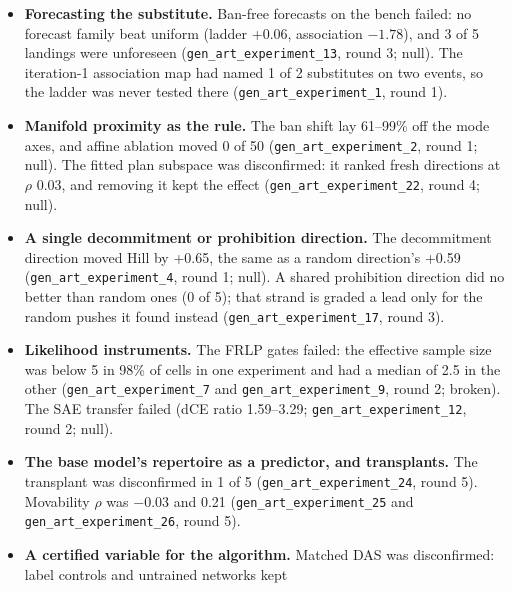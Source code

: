 \documentclass[10pt]{article}
\begin{document}
\begin{itemize}
\item \textbf{Forecasting the substitute.} Ban-free forecasts on the bench failed: no forecast family beat uniform (ladder
+0.06, association $-1.78$), and 3 of 5 landings were unforeseen (\texttt{gen\_\allowbreak{}art\_\allowbreak{}experiment\_\allowbreak{}13}, round 3; null). The
iteration-1 association map had named 1 of 2 substitutes on two events, so the ladder was never tested there
(\texttt{gen\_\allowbreak{}art\_\allowbreak{}experiment\_\allowbreak{}1}, round 1).
\item \textbf{Manifold proximity as the rule.} The ban shift lay 61--99\% off the mode axes, and affine ablation moved 0 of 50
(\texttt{gen\_\allowbreak{}art\_\allowbreak{}experiment\_\allowbreak{}2}, round 1; null). The fitted plan subspace was disconfirmed: it ranked fresh directions at
$\rho$ 0.03, and removing it kept the effect (\texttt{gen\_\allowbreak{}art\_\allowbreak{}experiment\_\allowbreak{}22}, round 4; null).
\item \textbf{A single decommitment or prohibition direction.} The decommitment direction moved Hill by +0.65, the same as a
random direction's +0.59 (\texttt{gen\_\allowbreak{}art\_\allowbreak{}experiment\_\allowbreak{}4}, round 1; null). A shared prohibition direction did no better
than random ones (0 of 5); that strand is graded a lead only for the random pushes it found instead
(\texttt{gen\_\allowbreak{}art\_\allowbreak{}experiment\_\allowbreak{}17}, round 3).
\item \textbf{Likelihood instruments.} The FRLP gates failed: the effective sample size was below 5 in 98\% of cells in
one experiment and had a median of 2.5 in the other (\texttt{gen\_\allowbreak{}art\_\allowbreak{}experiment\_\allowbreak{}7} and \texttt{gen\_\allowbreak{}art\_\allowbreak{}experiment\_\allowbreak{}9},
round 2; broken). The SAE transfer failed (dCE ratio
1.59--3.29; \texttt{gen\_\allowbreak{}art\_\allowbreak{}experiment\_\allowbreak{}12}, round 2; null).
\item \textbf{The base model's repertoire as a predictor, and transplants.} The transplant was disconfirmed in 1 of 5
(\texttt{gen\_\allowbreak{}art\_\allowbreak{}experiment\_\allowbreak{}24}, round 5). Movability $\rho$ was $-0.03$ and 0.21 (\texttt{gen\_\allowbreak{}art\_\allowbreak{}experiment\_\allowbreak{}25} and
\texttt{gen\_\allowbreak{}art\_\allowbreak{}experiment\_\allowbreak{}26}, round 5).
\item \textbf{A certified variable for the algorithm.} Matched DAS was disconfirmed: label controls and untrained networks kept

\end{itemize}
\end{document}
